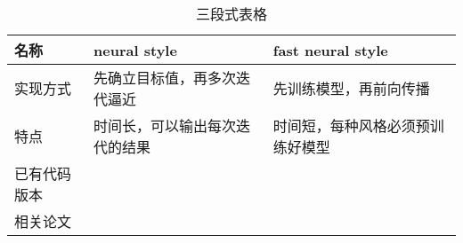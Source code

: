 \begin{table}[H]
\centering
\begin{tabular}{lll}
\toprule
名称     & neural style    & fast neural style \\
\midrule
实现方式   & 先确立目标值，再多次迭代逼近  & 先训练模型，再前向传播       \\
特点     & 时间长，可以输出每次迭代的结果 & 时间短，每种风格必须预训练好模型  \\
已有代码版本 &                 &                   \\
相关论文   &                 &                  \\
\bottomrule
\end{tabular}
\caption{三段式表格}
\label{table-test}
\end{table}
